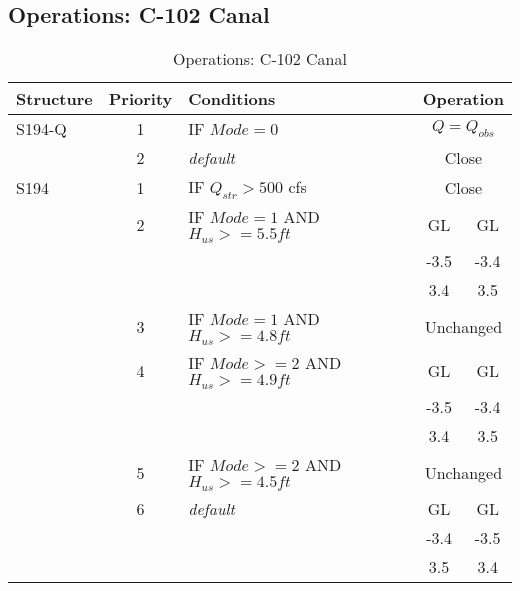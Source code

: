 \subsection{Operations: C-102 Canal}

\scriptsize
\begin{table}[!h]
\centering
\caption{Operations: C-102 Canal}
\label{tab:M11opsC102}
\begin{tabular}{|l|c|l|c|c|}
\hline
\textbf{Structure} & \textbf{Priority}  & \textbf{Conditions} & \multicolumn{2}{|c|}{\textbf{Operation}}   \\
\hline
\hline
S194-Q        &  1  & IF $Mode=0$                   & \multicolumn{2}{|c|}{$Q = Q_{obs}$}   \\
\hline
              &  2  & \it{default}                  & \multicolumn{2}{|c|}{Close}           \\
\hline
\hline
S194          &  1  & IF $Q_{str}>500$ cfs                               & \multicolumn{2}{|c|}{Close}   \\
\hline
              &  2  & IF $Mode=1$ AND $H_{us}>=5.5 ft$                   & GL    & GL   \\
              &     &                                                    & -3.5  & -3.4 \\
              &     &                                                    & 3.4   & 3.5  \\
\hline
              &  3  & IF $Mode=1$ AND $H_{us}>=4.8ft$                    & \multicolumn{2}{|c|}{Unchanged}   \\
\hline
              &  4  & IF $Mode>=2$ AND $H_{us}>=4.9 ft$                  & GL    & GL   \\
              &     &                                                    & -3.5  & -3.4 \\
              &     &                                                    & 3.4   & 3.5  \\
\hline
              &  5  & IF $Mode>=2$ AND $H_{us}>=4.5ft$                   & \multicolumn{2}{|c|}{Unchanged}   \\
\hline
              &  6  & \it{default}                                       & GL    & GL    \\
              &     &                                                    & -3.4  & -3.5 \\
              &     &                                                    & 3.5   & 3.4  \\
\hline
\hline
\end{tabular}
\end{table}
\normalsize

